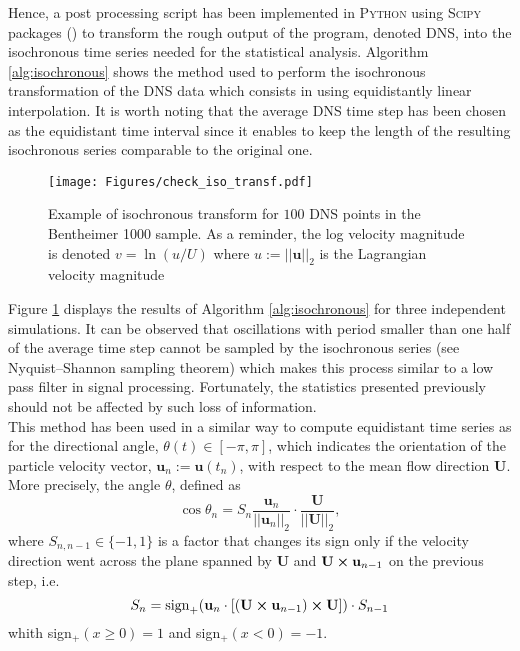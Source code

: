 Hence, a post processing script has been implemented in \textsc{Python} using \textsc{Scipy} packages (\cite{scipy}) to transform the rough output of the program, denoted DNS, into the isochronous time series needed for the statistical analysis.
Algorithm \ref{alg:isochronous} shows the method used to perform the isochronous transformation of the DNS data which consists in using equidistantly linear interpolation.
It is worth noting that the average DNS time step has been chosen as the equidistant time interval since it enables to keep the length of the resulting isochronous series comparable to the original one.\\
\begin{figure}
	\centering
	\texttt{[image: Figures/check\_iso\_transf.pdf]}
	\caption{Example of isochronous transform for $100$ DNS points in the Bentheimer 1000 sample. As a reminder, the log velocity magnitude is denoted $v=\ln{(u/U)}$ where $u:=||\textbf{u}||_2$ is the Lagrangian velocity magnitude}
	\label{fig:checkisotransf}
\end{figure}
Figure \ref{fig:checkisotransf} displays the results of Algorithm \ref{alg:isochronous} for three independent simulations.
It can be observed that oscillations with period smaller than one half of the average time step cannot be sampled by the isochronous series (see Nyquist–Shannon sampling theorem) which makes this process similar to a low pass filter in signal processing.
Fortunately, the statistics presented previously should not be affected by such loss of information.\\

This method has been used in a similar way to compute equidistant time series as for the directional angle, $\theta (t)\in[-\pi,\pi]$, which indicates the orientation of the particle velocity vector, $\textbf{u}_n :=\textbf{u}(t_n)$, with respect to the mean flow direction $\textbf{U}$.
More precisely, the angle $\theta$, defined as
\begin{equation}
\cos \theta_n = S_{n} \frac{\textbf{u}_n}{||\textbf{u}_n||_2 }\cdot \frac{\textbf{U}}{||\textbf{U}||_2},
\end{equation}
where $S_{n,n-1}\in\{-1,1\}$ is a factor that changes its sign only if the velocity direction went across the plane spanned by $\textbf{U}$ and $\textbf{U}\cross\textbf{u}_{n-1}$ on the previous step, i.e.
\begin{equation}
S_{n} = \mathrm{sign}_+(\textbf{u}_n\cdot [(\textbf{U}\cross\textbf{u}_{n-1})\cross \textbf{U}])\cdot S_{n-1} 
\end{equation}
whith sign$_+(x\geq 0)=1$ and sign$_+(x< 0)=-1$.

